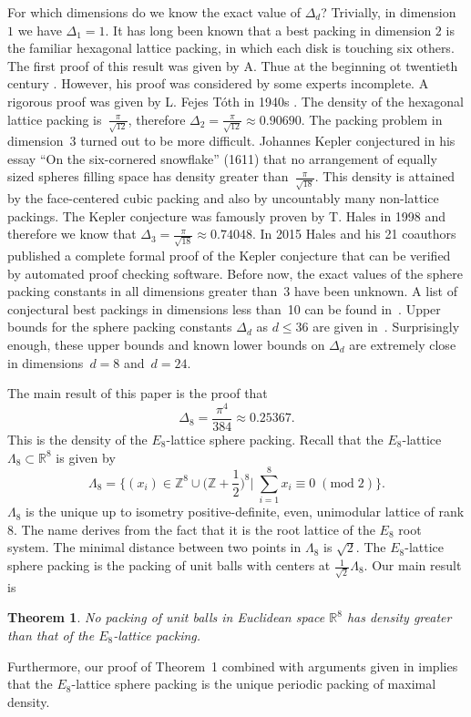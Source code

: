\documentclass{scrartcl}
\newcommand{\R}{\mathbb{R}}
\newcommand{\Z}{\mathbb{Z}}
\newtheorem{theorem}{Theorem}
\begin{document}
For which dimensions do we know the exact value of $\Delta_d$? Trivially, in dimension~$1$ we have $\Delta_1=1$. It has long been known  that a best packing in dimension $2$ is the familiar hexagonal lattice packing, in which each disk is touching six others. The first proof of this result was given by A. Thue at the beginning ot twentieth century \cite{Thue}. However, his proof was considered by some experts incomplete. A rigorous proof was given by L. Fejes T\'{o}th in 1940s \cite{Toth}. The density of the hexagonal lattice packing is~$\frac{\pi}{\sqrt{12}}$, therefore  $\Delta_2=\frac{\pi}{\sqrt{12}}\approx0.90690$. The packing problem in dimension~3 turned out to be more difficult. Johannes Kepler conjectured in his essay ``On the six-cornered snowflake'' (1611) that no arrangement of equally sized spheres filling space has density greater than~$\frac{\pi}{\sqrt{18}}$.  This density is attained by the face-centered cubic packing and also by uncountably many non-lattice packings. The Kepler conjecture was famously proven by T. Hales in 1998 \cite{Hales} and therefore we know that $\Delta_3=\frac{\pi}{\sqrt{18}}\approx0.74048$. In
2015 Hales and his 21 coauthors published a complete formal proof of the Kepler conjecture that can be  verified by automated proof checking software. Before now, the exact values of the sphere packing constants in all dimensions greater than~3 have been unknown. A list of conjectural best packings in dimensions less than~10 can be found in~\cite{ConwaySloan}. Upper bounds for the sphere packing constants $\Delta_d$ as $d\leq 36$ are given in~\cite{ElkiesCohn}. Surprisingly enough, these upper bounds and known lower bounds on $\Delta_d$ are extremely close in dimensions~$d=8$ and~$d=24$.

The main result of this paper is the proof that $$\Delta_8=\frac{\pi^4}{384}\approx 0.25367.$$
This is the density of the $E_8$-lattice sphere packing. Recall that the $E_8$-lattice $\Lambda_8\subset\R^8$ is given by
$$\Lambda_8=\{(x_i)\in\Z^8\cup(\Z+\textstyle\frac12\displaystyle )^8|\;\sum_{i=1}^8x_i\equiv 0\;(\mathrm{mod\;2})\}.$$
$\Lambda_8$ is the unique up to isometry positive-definite, even, unimodular lattice of rank 8. The name derives from the fact that it is the root lattice of the $E_8$ root system. The minimal distance between two points in $\Lambda_8$ is $\sqrt{2}$.
The $E_8$-lattice sphere packing is the packing of unit balls with centers at $\frac{1}{\sqrt{2}}\Lambda_8.$ Our main result is
\begin{theorem}\label{thm: main}
 No packing of unit balls
in Euclidean space $\R^8$ has density greater than that of the $E_8$-lattice packing.
\end{theorem}
Furthermore, our proof of Theorem~1 combined with arguments given in \cite[Section~8]{ElkiesCohn} implies that the $E_8$-lattice sphere packing is the unique periodic packing of maximal density.
\end{document}
